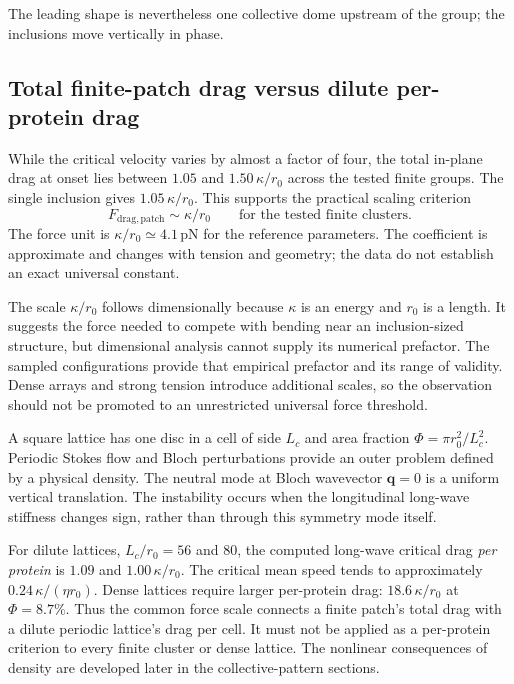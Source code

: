 The leading shape is nevertheless one collective dome upstream of the group; the inclusions move vertically in phase.




\subsection{Total finite-patch drag versus dilute per-protein drag}


While the critical velocity varies by almost a factor of four, the total in-plane drag at onset lies between $1.05$ and $1.50\,\kappa/r_0$ across the tested finite groups. The single inclusion gives $1.05\,\kappa/r_0$. This supports the practical scaling criterion
\begin{equation}
F_{\mathrm{drag,patch}}\sim\kappa/r_0\qquad\text{for the tested finite clusters}.\label{eq:drag}
\end{equation}
The force unit is $\kappa/r_0\simeq4.1\,\mathrm{pN}$ for the reference parameters. The coefficient is approximate and changes with tension and geometry; the data do not establish an exact universal constant.


The scale $\kappa/r_0$ follows dimensionally because $\kappa$ is an energy and $r_0$ is a length. It suggests the force needed to compete with bending near an inclusion-sized structure, but dimensional analysis cannot supply its numerical prefactor. The sampled configurations provide that empirical prefactor and its range of validity. Dense arrays and strong tension introduce additional scales, so the observation should not be promoted to an unrestricted universal force threshold.


A square lattice has one disc in a cell of side $L_c$ and area fraction $\Phi=\pi r_0^2/L_c^2$. Periodic Stokes flow and Bloch perturbations provide an outer problem defined by a physical density. The neutral mode at Bloch wavevector $\bm q=0$ is a uniform vertical translation. The instability occurs when the longitudinal long-wave stiffness changes sign, rather than through this symmetry mode itself.

For dilute lattices, $L_c/r_0=56$ and $80$, the computed long-wave critical drag \emph{per protein} is $1.09$ and $1.00\,\kappa/r_0$. The critical mean speed tends to approximately $0.24\,\kappa/(\eta r_0)$. Dense lattices require larger per-protein drag: $18.6\,\kappa/r_0$ at $\Phi=8.7\%$. Thus the common force scale connects a finite patch's total drag with a dilute periodic lattice's drag per cell. It must not be applied as a per-protein criterion to every finite cluster or dense lattice. The nonlinear consequences of density are developed later in the collective-pattern sections.


